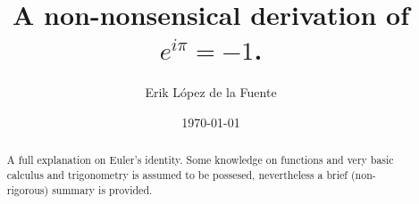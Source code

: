 \documentclass[a4paper, titlepage]{article}
\title{A non-nonsensical derivation of $e^{i\pi} = -1$.}
\author{Erik López de la Fuente}
\date{\today}
\begin{document}
\maketitle

\begin{abstract}
	A full explanation on Euler's identity. Some knowledge on functions and very basic calculus and trigonometry is assumed to be possesed, nevertheless a brief (non-rigorous) summary is provided.
\end{abstract}

\tableofcontents
\newpage







\end{document}
